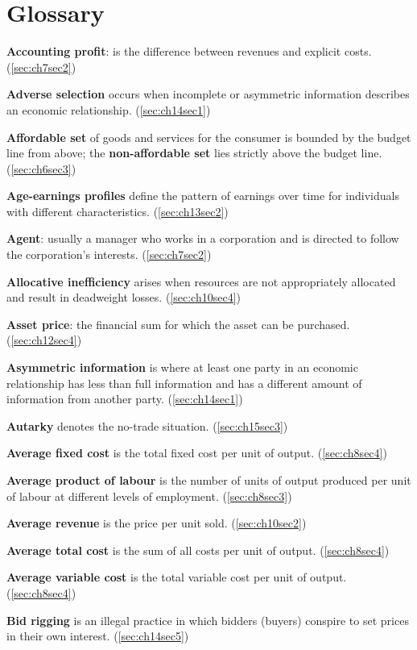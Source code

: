 \chapter*{Glossary}

\textbf{Accounting profit}: is the difference between revenues and explicit costs. (\ref{sec:ch7sec2})

\textbf{Adverse selection} occurs when incomplete or asymmetric information describes an economic relationship. (\ref{sec:ch14sec1})

\textbf{Affordable set} of goods and services for the consumer is bounded by the budget line from above; the \textbf{non-affordable set} lies strictly above the budget line. (\ref{sec:ch6sec3})

\textbf{Age-earnings profiles} define the pattern of earnings over time for individuals with different characteristics. (\ref{sec:ch13sec2})

\textbf{Agent}: usually a manager who works in a corporation and is directed to follow the corporation's interests. (\ref{sec:ch7sec2})

\textbf{Allocative inefficiency} arises when resources are not appropriately allocated and result in deadweight losses. (\ref{sec:ch10sec4})

\textbf{Asset price}: the financial sum for which the asset can be purchased. (\ref{sec:ch12sec4})

\textbf{Asymmetric information} is where at least one party in an economic relationship has less than full information and has a different amount of information from another party. (\ref{sec:ch14sec1})

\textbf{Autarky} denotes the no-trade situation. (\ref{sec:ch15sec3})

\textbf{Average fixed cost} is the total fixed cost per unit of output. (\ref{sec:ch8sec4})

\textbf{Average product of labour} is the number of units of output produced per unit of labour at different levels of employment. (\ref{sec:ch8sec3})

\textbf{Average revenue} is the price per unit sold. (\ref{sec:ch10sec2})

\textbf{Average total cost} is the sum of all costs per unit of output. (\ref{sec:ch8sec4})

\textbf{Average variable cost} is the total variable cost per unit of output. (\ref{sec:ch8sec4})

\textbf{Bid rigging} is an illegal practice in which bidders (buyers) conspire to set prices in their own interest. (\ref{sec:ch14sec5})

